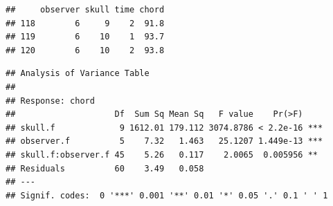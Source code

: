 \documentclass[
]{book}
\newenvironment{Shaded}{\begin{snugshade}}{\end{snugshade}}
\newcommand{\AttributeTok}[1]{\textcolor[rgb]{0.13,0.29,0.53}{#1}}
\newcommand{\FunctionTok}[1]{\textcolor[rgb]{0.13,0.29,0.53}{\textbf{#1}}}
\newcommand{\NormalTok}[1]{#1}
\newcommand{\OtherTok}[1]{\textcolor[rgb]{0.56,0.35,0.01}{#1}}
\newcommand{\SpecialCharTok}[1]{\textcolor[rgb]{0.81,0.36,0.00}{\textbf{#1}}}
\begin{document}
\begin{verbatim}
##     observer skull time chord
## 118        6     9    2  91.8
## 119        6    10    1  93.7
## 120        6    10    2  93.8
\end{verbatim}

\begin{Shaded}
\end{Shaded}

\begin{verbatim}
## Analysis of Variance Table
## 
## Response: chord
##                    Df  Sum Sq Mean Sq   F value    Pr(>F)    
## skull.f             9 1612.01 179.112 3074.8786 < 2.2e-16 ***
## observer.f          5    7.32   1.463   25.1207 1.449e-13 ***
## skull.f:observer.f 45    5.26   0.117    2.0065  0.005956 ** 
## Residuals          60    3.49   0.058                        
## ---
## Signif. codes:  0 '***' 0.001 '**' 0.01 '*' 0.05 '.' 0.1 ' ' 1
\end{verbatim}
\end{document}
